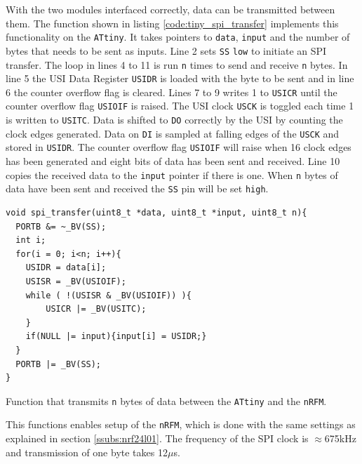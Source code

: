 {With the two modules interfaced correctly, data can be transmitted between them.
The function shown in listing \ref{code:tiny_spi_transfer} implements this functionality on the \texttt{ATtiny}.
It takes pointers to \texttt{data}, \texttt{input} and the number of bytes that needs to be sent as inputs.
Line 2 sets \texttt{SS} \texttt{low} to initiate an SPI transfer.
The loop in lines 4 to 11 is run \texttt{n} times to send and receive \texttt{n} bytes.
In line 5 the USI Data Register \texttt{USIDR} is loaded with the byte to be sent and in line 6 the counter overflow flag is cleared.
Lines 7 to 9 writes 1 to \texttt{USICR} until the counter overflow flag \texttt{USIOIF} is raised.
The USI clock \texttt{USCK} is toggled each time 1 is written to \texttt{USITC}.
Data is shifted to \texttt{DO} correctly by the USI by counting the clock edges generated. 
Data on \texttt{DI} is sampled at falling edges of the \texttt{USCK} and stored in \texttt{USIDR}.
The counter overflow flag \texttt{USIOIF} will raise when 16 clock edges has been generated and eight bits of data has been sent and received.
Line 10 copies the received data to the \texttt{input} pointer if there is one.
When \texttt{n} bytes of data have been sent and received the \texttt{SS} pin will be set \texttt{high}.
\begin{listing}[H] 
\begin{verbatim}
void spi_transfer(uint8_t *data, uint8_t *input, uint8_t n){
  PORTB &= ~_BV(SS);
  int i;
  for(i = 0; i<n; i++){
	USIDR = data[i];
	USISR = _BV(USIOIF);  
	while ( !(USISR & _BV(USIOIF)) ){
		USICR |= _BV(USITC);  
	} 
	if(NULL |= input){input[i] = USIDR;}
  }
  PORTB |= _BV(SS);
}
\end{verbatim}
\caption[Data transmission between the \texttt{ATtiny84} and the \texttt{nRF24L01} ]{Function that transmits \texttt{n} bytes of data between the \texttt{ATtiny} and the \texttt{nRFM}.}
\label{code:tiny_spi_transfer}
\end{listing}

This functions enables setup of the \texttt{nRFM}, which is done with the same settings as explained in section \ref{ssubs:nrf24l01}.
The frequency of the SPI clock is $\approx$675kHz and transmission of one byte takes 12$\mu$s.


}
